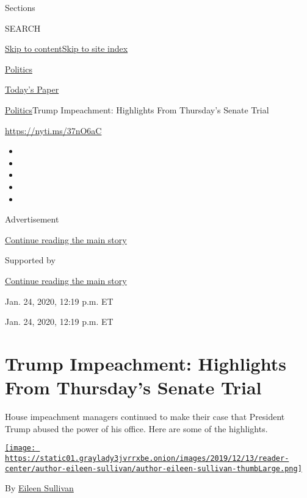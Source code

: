 Sections

SEARCH

\protect\hyperlink{site-content}{Skip to
content}\protect\hyperlink{site-index}{Skip to site index}

\href{https://www.nytimes3xbfgragh.onion/section/politics}{Politics}

\href{https://myaccount.nytimes3xbfgragh.onion/auth/login?response_type=cookie\&client_id=vi}{}

\href{https://www.nytimes3xbfgragh.onion/section/todayspaper}{Today's
Paper}

\href{/section/politics}{Politics}\textbar{}Trump Impeachment:
Highlights From Thursday's Senate Trial

\url{https://nyti.ms/37nO6aC}

\begin{itemize}
\item
\item
\item
\item
\item
\end{itemize}

Advertisement

\protect\hyperlink{after-top}{Continue reading the main story}

Supported by

\protect\hyperlink{after-sponsor}{Continue reading the main story}

Jan. 24, 2020, 12:19 p.m. ET

Jan. 24, 2020, 12:19 p.m. ET

\hypertarget{trump-impeachment-highlights-from-thursdays-senate-trial}{%
\section{Trump Impeachment: Highlights From Thursday's Senate
Trial}\label{trump-impeachment-highlights-from-thursdays-senate-trial}}

House impeachment managers continued to make their case that President
Trump abused the power of his office. Here are some of the highlights.

\href{https://www.nytimes3xbfgragh.onion/by/eileen-sullivan}{\texttt{[image: https://static01.graylady3jvrrxbe.onion/images/2019/12/13/reader-center/author-eileen-sullivan/author-eileen-sullivan-thumbLarge.png]}}

By \href{https://www.nytimes3xbfgragh.onion/by/eileen-sullivan}{Eileen
Sullivan}

